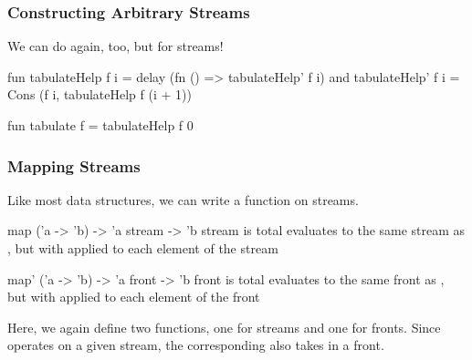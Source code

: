 \documentclass[aspectratio=169]{beamer}
\begin{document}
\begin{frame}[fragile]
  \frametitle{Constructing Arbitrary Streams}

  We can do  again, too, but for streams!

  \pause
  \vspace{\fill}

  \begin{codeblock}
    fun tabulateHelp  f i = delay (fn () => tabulateHelp' f i)
    and tabulateHelp' f i = Cons (f i, tabulateHelp f (i + 1))

    fun tabulate f = tabulateHelp f 0
  \end{codeblock}

  \pause
  \vspace{\fill}

\end{frame}

\begin{frame}[fragile]
  \frametitle{Mapping Streams}

  Like most data structures, we can write a  function on streams.

  \pause
  \vspace{\fill}

  \spec
    {map}
    {('a -> 'b) -> 'a stream -> 'b stream}
    { is total}
    { evaluates to the same stream as , but with
     applied to each element of the stream}

  \pause
  \vspace{\fill}

  \spec
    {map'}
    {('a -> 'b) -> 'a front -> 'b front}
    { is total}
    { evaluates to the same front as , but with
     applied to each element of the front}

  \pause
  \vspace{\fill}

  Here, we again define two functions, one for streams and one
  for fronts. Since  operates on a given stream, the
  corresponding  also takes in a front.
\end{frame}
\end{document}

